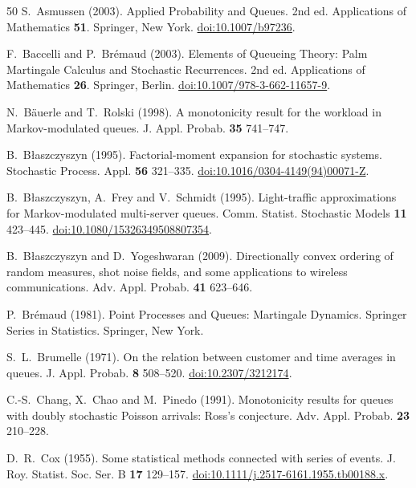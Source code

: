 \documentclass[11pt,reqno]{amsart}
\numberwithin{equation}{section}
\theoremstyle{plain}
\theoremstyle{definition}
\newcommand{\1}{\mathbf 1}
\begin{document}
\begin{thebibliography}{50}
S.~Asmussen (2003).
Applied Probability and Queues.
2nd ed. Applications of Mathematics \textbf{51}. Springer, New York.
\href{https://doi.org/10.1007/b97236}{doi:10.1007/b97236}.

F.~Baccelli and P.~Br\'emaud (2003).
Elements of Queueing Theory: Palm Martingale Calculus and Stochastic Recurrences.
2nd ed. Applications of Mathematics \textbf{26}. Springer, Berlin.
\href{https://doi.org/10.1007/978-3-662-11657-9}{doi:10.1007/978-3-662-11657-9}.

N.~B\"auerle and T.~Rolski (1998).
A monotonicity result for the workload in Markov-modulated queues.
J. Appl. Probab. \textbf{35} 741--747.

B.~B{\l}aszczyszyn (1995).
Factorial-moment expansion for stochastic systems.
Stochastic Process. Appl. \textbf{56} 321--335.
\href{https://doi.org/10.1016/0304-4149(94)00071-Z}{doi:10.1016/0304-4149(94)00071-Z}.

B.~B{\l}aszczyszyn, A.~Frey and V.~Schmidt (1995).
Light-traffic approximations for Markov-modulated multi-server queues.
Comm. Statist. Stochastic Models \textbf{11} 423--445.
\href{https://doi.org/10.1080/15326349508807354}{doi:10.1080/15326349508807354}.

B.~B{\l}aszczyszyn and D.~Yogeshwaran (2009).
Directionally convex ordering of random measures, shot noise fields, and some applications to wireless communications.
Adv. Appl. Probab. \textbf{41} 623--646.

P.~Br\'emaud (1981).
Point Processes and Queues: Martingale Dynamics.
Springer Series in Statistics. Springer, New York.

S.~L.~Brumelle (1971).
On the relation between customer and time averages in queues.
J. Appl. Probab. \textbf{8} 508--520.
\href{https://doi.org/10.2307/3212174}{doi:10.2307/3212174}.

C.-S.~Chang, X.~Chao and M.~Pinedo (1991).
Monotonicity results for queues with doubly stochastic Poisson arrivals: Ross's conjecture.
Adv. Appl. Probab. \textbf{23} 210--228.

D.~R.~Cox (1955).
Some statistical methods connected with series of events.
J. Roy. Statist. Soc. Ser. B \textbf{17} 129--157.
\href{https://doi.org/10.1111/j.2517-6161.1955.tb00188.x}{doi:10.1111/j.2517-6161.1955.tb00188.x}.


\end{thebibliography}
\end{document}
